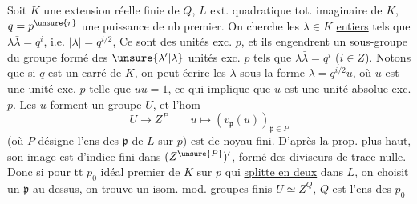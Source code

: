 
Soit $K$ une extension   réelle finie de $Q$, $L$ ext. quadratique tot. imaginaire de $K$, $q=p^{\unsure{r}}$ une puissance de nb premier. On cherche les $\lambda\in K$ \uline{entiers} tels que $\lambda\bar\lambda=q^i$, i.e. $|\lambda|=q^{i/2}$,  Ce sont des unités exc. $p$, et ils engendrent  un sous-groupe du groupe  formé des $\unsure{\lambda'|\lambda}$ unités exc. $p$ tels que $\lambda\bar\lambda=q^i$ ($i\in Z$). Notons que  si $q$ est un carré de $K$, on peut écrire les $\lambda$ sous la forme $\lambda=q^{i/2}u$, où $u$ est une unité exc. $p$ telle que $u\bar u=1$, ce qui implique que $u$ est une \uline{unité absolue} exc. $p$. Les $u$ forment un groupe $U$, et l'hom
\[
U\longrightarrow Z^P\qquad u\longmapsto(v_{\mathfrak p}(u))_{\mathfrak p\in P}
\]
(où $P$ désigne l'ens des $\mathfrak p$ de $L$ sur $p$) est de noyau fini. D'après la prop. plus haut, son image est  d'indice fini dans $(Z^{\unsure{P}})'$,  formé des diviseurs de trace  nulle. Donc si pour tt $p_0$  idéal premier de $K$ sur $p$ qui \uline{splitte en deux} dans $L$, on choisit un $\mathfrak p$ au dessus, on trouve un isom. mod. groupes finis $U\simeq Z^Q$, $Q$ est l'ens des $p_0$

